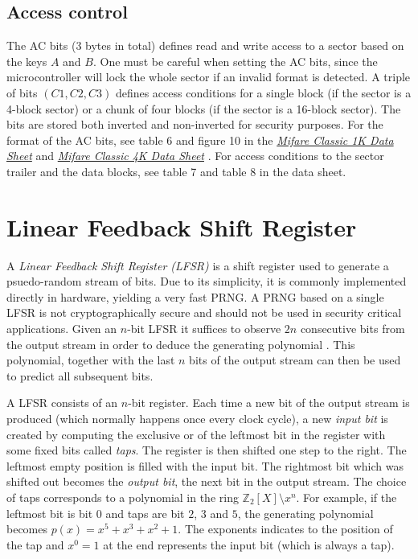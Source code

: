 \documentclass[10pt,twocolumn]{article}
\begin{document}
\subsection{Access control}
The AC bits (3 bytes in total) defines read and write access to a sector based on the keys $A$ and $B$. One must be careful when setting the AC bits, since the microcontroller will lock the whole sector if an invalid format is detected. A triple of bits $(C1, C2, C3)$ defines access conditions for a single block (if the sector is a 4-block sector) or a chunk of four blocks (if the sector is a 16-block sector). The bits are stored both inverted and non-inverted for security purposes. For the format of the AC bits, see table 6 and figure 10 in the \href{http://www.nxp.com/documents/data_sheet/MF1S50YYX.pdf}{\textit{Mifare Classic 1K Data Sheet}} \cite{mifare-sheet} and \href{https://www.nxp.com/documents/data_sheet/MF1S70YYX.pdf}{\textit{Mifare Classic 4K Data Sheet}} \cite{mifare4k-sheet}. For access conditions to the sector trailer and the data blocks, see table 7 and table 8 in the data sheet.

\section{Linear Feedback Shift Register}
A \textit{Linear Feedback Shift Register (LFSR)} is a shift register used to generate a psuedo-random stream of bits. Due to its simplicity, it is commonly implemented directly in hardware, yielding a very fast PRNG. A PRNG based on a single LFSR is not cryptographically secure and should not be used in security critical applications. Given an $n$-bit LFSR it suffices to observe $2n$ consecutive bits from the output stream in order to deduce the generating polynomial \cite{weisstein1}. This polynomial, together with the last $n$ bits of the output stream can then be used to predict all subsequent bits.

A LFSR consists of an $n$-bit register. Each time a new bit of the output stream is produced (which normally happens once every clock cycle), a new \textit{input bit} is created by computing the exclusive or of the leftmost bit in the register with some fixed bits called \textit{taps}. The register is then shifted one step to the right. The leftmost empty position is filled with the input bit. The rightmost bit which was shifted out becomes the \textit{output bit}, the next bit in the output stream. The choice of taps corresponds to a polynomial in the ring $\mathbb{Z}_2[X]\setminus x^n$. For example, if the leftmost bit is bit $0$ and taps are bit $2$, $3$ and $5$, the generating polynomial becomes $p(x)=x^5+x^3+x^2+1$. The exponents indicates to the position of the tap and $x^0=1$ at the end represents the input bit (which is always a tap).
\end{document}
